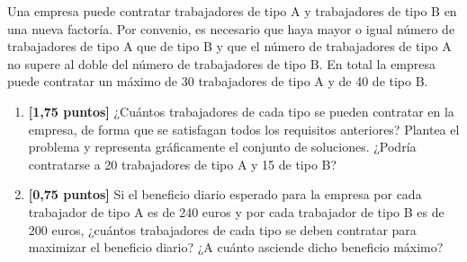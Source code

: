 \documentclass[
]{article}
\providecommand{\tightlist}{%
  \setlength{\itemsep}{0pt}\setlength{\parskip}{0pt}}
\begin{document}
\begin{exercise} Una empresa puede contratar trabajadores de tipo A y
trabajadores de tipo B en una nueva factoría. Por convenio, es necesario
que haya mayor o igual número de trabajadores de tipo A que de tipo B y
que el número de trabajadores de tipo A no supere al doble del número de
trabajadores de tipo B. En total la empresa puede contratar un máximo de
30 trabajadores de tipo A y de 40 de tipo B.

\begin{enumerate}
\def\labelenumi{\alph{enumi})}
\tightlist
\item
  \textbf{{[}1,75 puntos{]}} ¿Cuántos trabajadores de cada tipo se
  pueden contratar en la empresa, de forma que se satisfagan todos los
  requisitos anteriores? Plantea el problema y representa gráficamente
  el conjunto de soluciones. ¿Podría contratarse a 20 trabajadores de
  tipo A y 15 de tipo B?
\item
  \textbf{{[}0,75 puntos{]}} Si el beneficio diario esperado para la
  empresa por cada trabajador de tipo A es de 240 euros y por cada
  trabajador de tipo B es de 200 euros, ¿cuántos trabajadores de cada
  tipo se deben contratar para maximizar el beneficio diario? ¿A cuánto
  asciende dicho beneficio máximo?
\end{enumerate}

\end{exercise}
\end{document}
